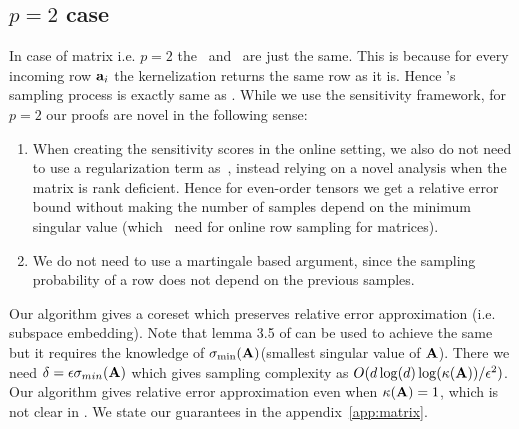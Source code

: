 \subsection{$p=2$ case}
In case of matrix i.e. $p=2$ the \online~and ~are just the same. This is because for every incoming row $\mathbf{a}_{i}$ the kernelization returns the same row as it is. Hence 's sampling process is exactly same as \online. While we use the sensitivity framework, for $p=2$ our proofs are novel in the following sense:
\begin{enumerate}
 \item  When creating the sensitivity scores in the online setting, we also do not need
 to use a regularization term as~\cite{cohen2016online}, instead relying on a novel analysis when the matrix is rank deficient. Hence
 for even-order tensors we get a relative error bound without making the number of samples depend on the minimum singular value (which~\cite{cohen2016online} need for online row sampling for matrices).
 \item We do not need to use a martingale based argument, since the sampling probability of a row does not depend on the previous samples. 
\end{enumerate}
Our algorithm gives a coreset which preserves relative error approximation (i.e. subspace embedding). Note that lemma 3.5 of \cite{cohen2016online} can be used to achieve the same but it requires the knowledge of $\sigma_{\min}(\mathbf{A})$(smallest singular value of $\mathbf{A}$). There we need $\delta = \epsilon\sigma_{min}(\mathbf{A})$ which gives sampling complexity as $O(d\log(d)\log(\kappa(\mathbf{A}))/\epsilon^{2})$. Our algorithm gives relative error approximation even when $\kappa(\mathbf{A}) =1$, which is not clear in \cite{cohen2016online}. We state our guarantees in the appendix~\ref{app:matrix}.
% 
